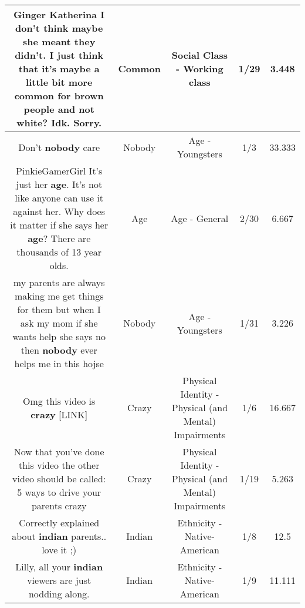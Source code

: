 \documentclass[11pt]{article}
\newlength\mylength
\begin{document}
\begin{center}
\begin{longtable}{|C{.65\mylength}|C{.30\mylength}|C{.12\mylength}|C{.12\mylength}|C{.12\mylength}|}
  \small Ginger Katherina I don't think maybe she meant they didn't. I just think that it's maybe a little bit more \textbf{common} for brown people and not white? Idk. Sorry.\normalsize   & Common & Social Class - Working class & 1/29 & 3.448 \\  \hline
  \small Don't \textbf{nobody} care\normalsize   & Nobody & Age - Youngsters & 1/3 & 33.333 \\  \hline
  \small PinkieGamerGirl It's just her \textbf{age}. It's not like anyone can use it against her. Why does it matter if she says her \textbf{age}? There are thousands of 13 year olds.\normalsize   & Age & Age - General & 2/30 & 6.667 \\  \hline
  \small my parents are always making me get things for them but when I ask my mom if she wants help she says no then \textbf{nobody} ever helps me in this hojse\normalsize   & Nobody & Age - Youngsters & 1/31 & 3.226 \\  \hline
  \small Omg this video is \textbf{crazy}  [LINK] \normalsize   & Crazy & Physical Identity - Physical (and Mental) Impairments & 1/6 & 16.667 \\  \hline
  \small Now that you've done this video the other video should be called: 5 ways to drive your parents crazy\normalsize   & Crazy & Physical Identity - Physical (and Mental) Impairments & 1/19 & 5.263 \\  \hline
  \small Correctly explained about \textbf{indian} parents..  love it ;)\normalsize   & Indian & Ethnicity - Native-American & 1/8 & 12.5 \\  \hline
  \small Lilly, all your \textbf{indian} viewers are just  nodding along.\normalsize   & Indian & Ethnicity - Native-American & 1/9 & 11.111 \\  \hline

\end{longtable}
\end{center}
\end{document}
